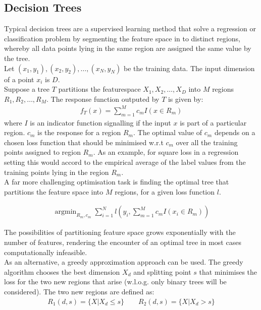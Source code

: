 \documentclass[a4paper, 11pt]{article}
\DeclareMathOperator*{\argmin}{argmin} %
\begin{document}
\subsection{Decision Trees}

Typical decision trees are a supervised learning method that solve a regression or classification problem by segmenting the feature space in to distinct regions, whereby all data points lying in the same region are assigned the same value by the tree. \\

Let ${(x_1,y_1),(x_2, y_2), \ldots, (x_N, y_N)}$ be the training data. The input dimension of a point $x_i$ is $D$.\\

Suppose a tree $T$ partitions the featurespace $X_1, X_2, \ldots, X_D$ into $M$ regions $R_1, R_2, \ldots, R_M$. The response function outputed by $T$ is given by:
\begin{align*}
f_T(x) = \sum_{m = 1}^{M} c_m I(x \in R_m)
\end{align*}
where $I$ is an indicator function signalling if the input $x$ is part of a particular region. $c_m$ is the response for a region $R_m$. The optimal value of $c_m$ depends on a chosen loss function that should be minimised w.r.t $c_m$ over all the training points assigned to region $R_m$. As an example, for square loss in a regression setting this would accord to the empirical average of the label values from the training points lying in the region $R_m$.\\

A far more challenging optimisation task is finding the optimal tree that partitions the feature space into $M$ regions, for a given loss function $l$.

\begin{align*}
\argmin_{R_m, c_m} \sum_{i =1}^{N} l(y_i, \sum_{m = 1}^{M} c_m I(x_i \in R_m))
\end{align*}

The possibilities of partitioning feature space grows exponentially with the number of features, rendering the encounter of an optimal tree in most cases computationally infeasible.\\

As an alternative, a greedy approximation approach can be used. The greedy algorithm chooses the best dimension $X_d$ and splitting point $s$ that minimises the loss for the two new regions that arise (w.l.o.g. only binary trees will be considered). The two new regions are defined as:
\begin{align*}
R_1(d, s) = \{X | X_d \leq s\} \qquad R_2(d, s) = \{X | X_d > s \}
\end{align*}
\end{document}
